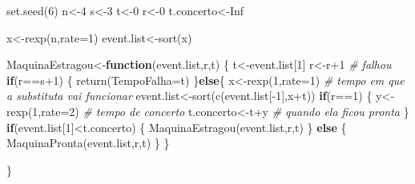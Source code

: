 \documentclass[
  12pt,
]{article}
\newenvironment{Shaded}{\begin{snugshade}}{\end{snugshade}}
\newcommand{\AttributeTok}[1]{\textcolor[rgb]{0.77,0.63,0.00}{#1}}
\newcommand{\CommentTok}[1]{\textcolor[rgb]{0.56,0.35,0.01}{\textit{#1}}}
\newcommand{\ConstantTok}[1]{\textcolor[rgb]{0.00,0.00,0.00}{#1}}
\newcommand{\ControlFlowTok}[1]{\textcolor[rgb]{0.13,0.29,0.53}{\textbf{#1}}}
\newcommand{\DecValTok}[1]{\textcolor[rgb]{0.00,0.00,0.81}{#1}}
\newcommand{\FunctionTok}[1]{\textcolor[rgb]{0.00,0.00,0.00}{#1}}
\newcommand{\NormalTok}[1]{#1}
\newcommand{\OtherTok}[1]{\textcolor[rgb]{0.56,0.35,0.01}{#1}}
\newcommand{\SpecialCharTok}[1]{\textcolor[rgb]{0.00,0.00,0.00}{#1}}
\begin{document}
\begin{Shaded}
\begin{Highlighting}[]
\FunctionTok{set.seed}\NormalTok{(}\DecValTok{6}\NormalTok{)}
\NormalTok{n}\OtherTok{\textless{}{-}}\DecValTok{4}
\NormalTok{s}\OtherTok{\textless{}{-}}\DecValTok{3}
\NormalTok{t}\OtherTok{\textless{}{-}}\DecValTok{0}
\NormalTok{r}\OtherTok{\textless{}{-}}\DecValTok{0}
\NormalTok{t.concerto}\OtherTok{\textless{}{-}}\ConstantTok{Inf}

\NormalTok{x}\OtherTok{\textless{}{-}}\FunctionTok{rexp}\NormalTok{(n,}\AttributeTok{rate=}\DecValTok{1}\NormalTok{)}
\NormalTok{event.list}\OtherTok{\textless{}{-}}\FunctionTok{sort}\NormalTok{(x)}

\NormalTok{MaquinaEstragou}\OtherTok{\textless{}{-}}\ControlFlowTok{function}\NormalTok{(event.list,r,t)}
\NormalTok{\{}
\NormalTok{  t}\OtherTok{\textless{}{-}}\NormalTok{event.list[}\DecValTok{1}\NormalTok{]}
\NormalTok{  r}\OtherTok{\textless{}{-}}\NormalTok{r}\SpecialCharTok{+}\DecValTok{1} \CommentTok{\# falhou}
  \ControlFlowTok{if}\NormalTok{(r}\SpecialCharTok{==}\NormalTok{s}\SpecialCharTok{+}\DecValTok{1}\NormalTok{)}
\NormalTok{  \{}
    \FunctionTok{return}\NormalTok{(}\AttributeTok{TempoFalha=}\NormalTok{t)}
\NormalTok{  \}}\ControlFlowTok{else}\NormalTok{\{}
\NormalTok{    x}\OtherTok{\textless{}{-}}\FunctionTok{rexp}\NormalTok{(}\DecValTok{1}\NormalTok{,}\AttributeTok{rate=}\DecValTok{1}\NormalTok{) }\CommentTok{\# tempo em que a substituta vai funcionar}
\NormalTok{    event.list}\OtherTok{\textless{}{-}}\FunctionTok{sort}\NormalTok{(}\FunctionTok{c}\NormalTok{(event.list[}\SpecialCharTok{{-}}\DecValTok{1}\NormalTok{],x}\SpecialCharTok{+}\NormalTok{t))}
    \ControlFlowTok{if}\NormalTok{(r}\SpecialCharTok{==}\DecValTok{1}\NormalTok{)}
\NormalTok{    \{}
\NormalTok{      y}\OtherTok{\textless{}{-}}\FunctionTok{rexp}\NormalTok{(}\DecValTok{1}\NormalTok{,}\AttributeTok{rate=}\DecValTok{2}\NormalTok{) }\CommentTok{\# tempo de concerto}
\NormalTok{      t.concerto}\OtherTok{\textless{}{-}}\NormalTok{t}\SpecialCharTok{+}\NormalTok{y  }\CommentTok{\# quando ela ficou pronta}
\NormalTok{    \}}
    \ControlFlowTok{if}\NormalTok{(event.list[}\DecValTok{1}\NormalTok{]}\SpecialCharTok{\textless{}}\NormalTok{t.concerto)}
\NormalTok{    \{}
      \FunctionTok{MaquinaEstragou}\NormalTok{(event.list,r,t)}
\NormalTok{    \}}
    \ControlFlowTok{else}
\NormalTok{    \{}
      \FunctionTok{MaquinaPronta}\NormalTok{(event.list,r,t)}
\NormalTok{    \}}
\NormalTok{  \}}

\NormalTok{\}}


\end{Highlighting}
\end{Shaded}
\end{document}
